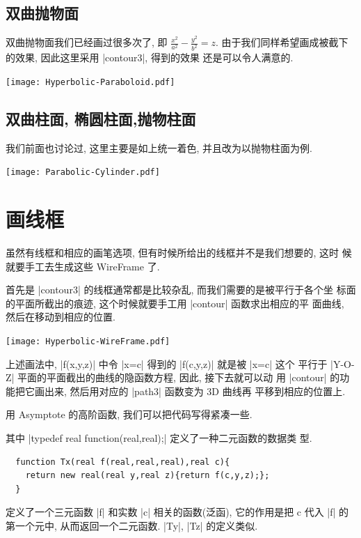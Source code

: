 \documentclass[nofonts,CJKnormalspaces]{ctexbook}[2009/05/20]
\begin{document}
\subsection{双曲抛物面}
双曲抛物面我们已经画过很多次了, 即
$\frac{x^{2}}{a^{2}}-\frac{y^{2}}{b^{2}}=z$.
由于我们同样希望画成被截下的效果, 因此这里采用 |contour3|, 得到的效果
还是可以令人满意的.
\begin{center}\texttt{[image: Hyperbolic-Paraboloid.pdf]}\end{center}%


\subsection{双曲柱面, 椭圆柱面,抛物柱面}
我们前面也讨论过, 这里主要是如上统一着色, 并且改为以抛物柱面为例.
\begin{center}\texttt{[image: Parabolic-Cylinder.pdf]}\end{center}%



\section{画线框}
虽然有线框和相应的画笔选项, 但有时候所给出的线框并不是我们想要的, 这时
候就要手工去生成这些 WireFrame 了.

首先是 |contour3| 的线框通常都是比较杂乱, 而我们需要的是被平行于各个坐
标面的平面所截出的痕迹, 这个时候就要手工用 |contour| 函数求出相应的平
面曲线, 然后在移动到相应的位置.
\begin{center}\texttt{[image: Hyperbolic-WireFrame.pdf]}\end{center}%

上述画法中, |f(x,y,z)| 中令 |x=c| 得到的 |f(c,y,z)| 就是被 |x=c| 这个
平行于 |Y-O-Z| 平面的平面截出的曲线的隐函数方程, 因此, 接下去就可以动
用 |contour| 的功能把它画出来, 然后用对应的 |path3| 函数变为 3D 曲线再
平移到相应的位置上.

用 Asymptote 的高阶函数, 我们可以把代码写得紧凑一些.

其中 |typedef real function(real,real);| 定义了一种二元函数的数据类
型.
\begin{lstlisting}
  function Tx(real f(real,real,real),real c){
    return new real(real y,real z){return f(c,y,z);};
  }
\end{lstlisting}
定义了一个三元函数 |f| 和实数 |c| 相关的函数(泛函), 它的作用是把 c 代入
|f| 的第一个元中, 从而返回一个二元函数. |Ty|, |Tz| 的定义类似.
\end{document}
